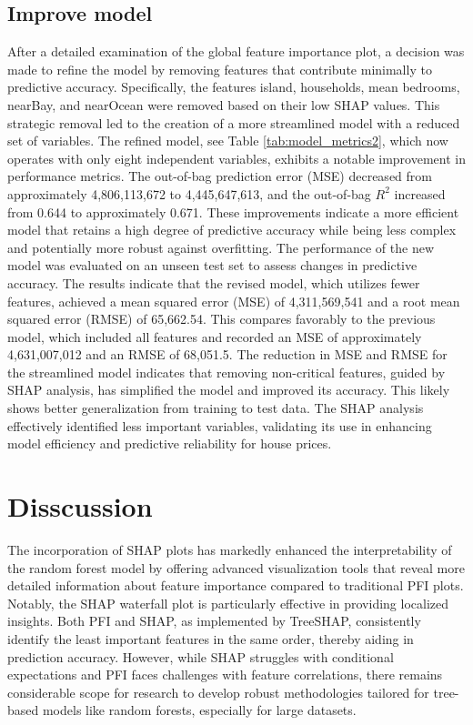 \documentclass[12pt]{article}
\begin{document}
\subsection{Improve model}
After a detailed examination of the global feature importance plot, a decision was made to refine the model by removing features that contribute minimally to predictive accuracy. 
Specifically, the features island, households, mean bedrooms, nearBay, and nearOcean were removed based on their low SHAP values. This strategic removal led to the creation of a more streamlined model with a reduced set of variables. 
The refined model, see Table \ref{tab:model_metrics2}, which now operates with only eight independent variables, exhibits a notable improvement in performance metrics. The out-of-bag prediction error (MSE) decreased from approximately 4,806,113,672 to 4,445,647,613, and the out-of-bag $R^2$ increased from 0.644 to approximately 0.671. These improvements indicate a more efficient model that retains a high degree of predictive accuracy while being less complex and potentially more robust against overfitting.
The performance of the new model was evaluated on an unseen test set to assess changes in predictive accuracy. The results indicate that the revised model, which utilizes fewer features, achieved a mean squared error (MSE) of 4,311,569,541 and a root mean squared error (RMSE) of 65,662.54. This compares favorably to the previous model, which included all features and recorded an MSE of approximately 4,631,007,012 and an RMSE of 68,051.5.
The reduction in MSE and RMSE for the streamlined model indicates that removing non-critical features, guided by SHAP analysis, has simplified the model and improved its accuracy. This likely shows better generalization from training to test data. The SHAP analysis effectively identified less important variables, validating its use in enhancing model efficiency and predictive reliability for house prices.

\section{Disscussion}
The incorporation of SHAP plots has markedly enhanced the interpretability of the random forest model by offering advanced visualization tools that reveal more detailed information about feature importance compared to traditional PFI plots. Notably, the SHAP waterfall plot is particularly effective in providing localized insights. Both PFI and SHAP, as implemented by TreeSHAP, consistently identify the least important features in the same order, thereby aiding in prediction accuracy. However, while SHAP struggles with conditional expectations and PFI faces challenges with feature correlations, there remains considerable scope for research to develop robust methodologies tailored for tree-based models like random forests, especially for large datasets.
\end{document}
